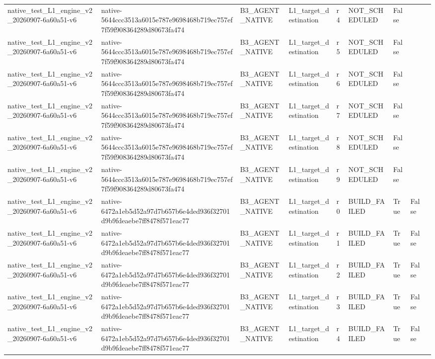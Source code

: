 \begin{tabular}{lllllllll}
native\_test\_L1\_engine\_v2\_20260907-6a60a51-v6 & native-5644ccc3513a6015e787e9698468b719ec757ef7f59f908364289d80673fa474 & B3\_AGENT\_NATIVE & L1\_target\_destination & r4 & NOT\_SCHEDULED & False &  &  \\
native\_test\_L1\_engine\_v2\_20260907-6a60a51-v6 & native-5644ccc3513a6015e787e9698468b719ec757ef7f59f908364289d80673fa474 & B3\_AGENT\_NATIVE & L1\_target\_destination & r5 & NOT\_SCHEDULED & False &  &  \\
native\_test\_L1\_engine\_v2\_20260907-6a60a51-v6 & native-5644ccc3513a6015e787e9698468b719ec757ef7f59f908364289d80673fa474 & B3\_AGENT\_NATIVE & L1\_target\_destination & r6 & NOT\_SCHEDULED & False &  &  \\
native\_test\_L1\_engine\_v2\_20260907-6a60a51-v6 & native-5644ccc3513a6015e787e9698468b719ec757ef7f59f908364289d80673fa474 & B3\_AGENT\_NATIVE & L1\_target\_destination & r7 & NOT\_SCHEDULED & False &  &  \\
native\_test\_L1\_engine\_v2\_20260907-6a60a51-v6 & native-5644ccc3513a6015e787e9698468b719ec757ef7f59f908364289d80673fa474 & B3\_AGENT\_NATIVE & L1\_target\_destination & r8 & NOT\_SCHEDULED & False &  &  \\
native\_test\_L1\_engine\_v2\_20260907-6a60a51-v6 & native-5644ccc3513a6015e787e9698468b719ec757ef7f59f908364289d80673fa474 & B3\_AGENT\_NATIVE & L1\_target\_destination & r9 & NOT\_SCHEDULED & False &  &  \\
native\_test\_L1\_engine\_v2\_20260907-6a60a51-v6 & native-6472a1eb5d52a97d7b657b6e4ded936f32701d9b9fdeaebe7ff8478f571eac77 & B3\_AGENT\_NATIVE & L1\_target\_destination & r0 & BUILD\_FAILED & True & False &  \\
native\_test\_L1\_engine\_v2\_20260907-6a60a51-v6 & native-6472a1eb5d52a97d7b657b6e4ded936f32701d9b9fdeaebe7ff8478f571eac77 & B3\_AGENT\_NATIVE & L1\_target\_destination & r1 & BUILD\_FAILED & True & False &  \\
native\_test\_L1\_engine\_v2\_20260907-6a60a51-v6 & native-6472a1eb5d52a97d7b657b6e4ded936f32701d9b9fdeaebe7ff8478f571eac77 & B3\_AGENT\_NATIVE & L1\_target\_destination & r2 & BUILD\_FAILED & True & False &  \\
native\_test\_L1\_engine\_v2\_20260907-6a60a51-v6 & native-6472a1eb5d52a97d7b657b6e4ded936f32701d9b9fdeaebe7ff8478f571eac77 & B3\_AGENT\_NATIVE & L1\_target\_destination & r3 & BUILD\_FAILED & True & False &  \\
native\_test\_L1\_engine\_v2\_20260907-6a60a51-v6 & native-6472a1eb5d52a97d7b657b6e4ded936f32701d9b9fdeaebe7ff8478f571eac77 & B3\_AGENT\_NATIVE & L1\_target\_destination & r4 & BUILD\_FAILED & True & False &  \\

\end{tabular}

